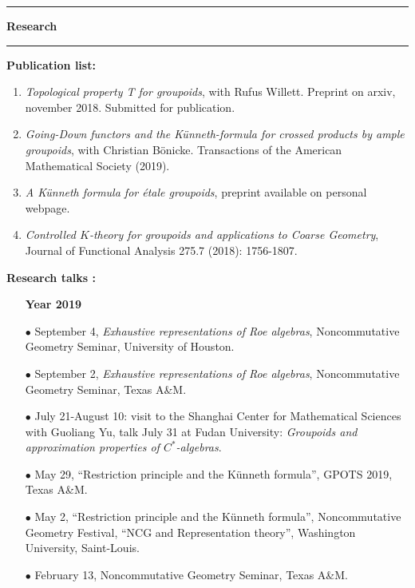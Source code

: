 \documentclass[a4paper,11pt]{article}
\newcommand\espace{\vrule height 20pt width 0pt}
\newcommand{\titre}[1]{%
	\begin{center}
	\bigskip
	\rule{\textwidth}{1pt}
	\par\vspace{0.1cm}
        \textbf{\large #1}
	\par\rule{\textwidth}{1pt}
	\end{center}
	\bigskip
	}
\begin{document}
\newpage
\titre{Research}
\textbf{Publication list:} 
\begin{enumerate}
\item \textit{Topological property T for groupoids}, with Rufus Willett. Preprint on arxiv, november 2018. Submitted for publication.
\item \textit{Going-Down functors and the Künneth-formula for crossed products by ample groupoids}, with Christian Bönicke. Transactions of the American Mathematical Society (2019).
\item \textit{A K\"{u}nneth formula for \'etale groupoids}, preprint available on personal webpage.
\item \textit{Controlled $K$-theory for groupoids and applications to Coarse Geometry}, Journal of Functional Analysis 275.7 (2018): 1756-1807.
\end{enumerate}
\espace

\textbf{Research talks :}\\

\begin{itemize}
\item[\textbf{Year 2019}]
\item[$\bullet$] September 4, \textit{Exhaustive representations of Roe algebras}, Noncommutative Geometry Seminar, University of Houston.
\item[$\bullet$] September 2, \textit{Exhaustive representations of Roe algebras}, Noncommutative Geometry Seminar, Texas A\&M. 
\item[$\bullet$] July 21-August 10: visit to the Shanghai Center for Mathematical Sciences with Guoliang Yu, talk July 31 at Fudan University: \textit{Groupoids and approximation properties of $C^*$-algebras}. 
\item[$\bullet$] May 29, ``Restriction principle and the Künneth formula'', GPOTS 2019, Texas A\&M.
\item[$\bullet$] May 2, ``Restriction principle and the Künneth formula'', Noncommutative Geometry Festival, ``NCG and Representation theory'', Washington University, Saint-Louis.
\item[$\bullet$] February 13, Noncommutative Geometry Seminar, Texas A\&M.
\end{itemize}
\end{document}
